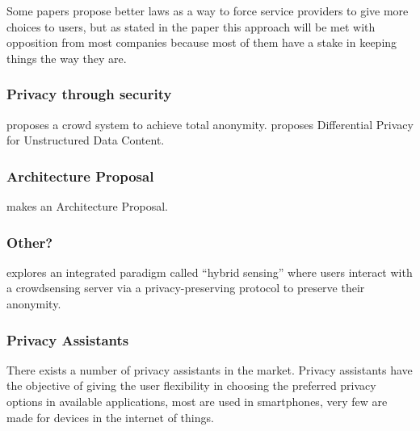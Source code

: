 \documentclass[conference]{IEEEtran}
\begin{document}
Some papers propose better laws \cite{} as a way to force service providers
to give more choices to users, but as stated in the paper this
approach will be met with opposition from most companies because
most of them have a stake in keeping things the way they are.

\subsubsection{Privacy through security}

\cite{SunSecure} proposes a crowd system to achieve total anonymity.
\cite{ZhaoSurvey} proposes Differential Privacy for Unstructured Data Content.

\subsubsection{Architecture Proposal}

\cite{AntunesFederated} makes an Architecture Proposal.

\subsubsection{Other?}

\cite{ZhuIntegrating} explores an integrated paradigm called ``hybrid sensing'' where users interact with a crowdsensing server via a privacy-preserving protocol to preserve their anonymity.

\subsubsection{Privacy Assistants}

There exists a number of privacy assistants in the market. Privacy assistants
have the objective of giving the user flexibility in choosing the
preferred privacy options in available applications, most are used in
smartphones, very few are made for devices in the internet of things.
\end{document}
